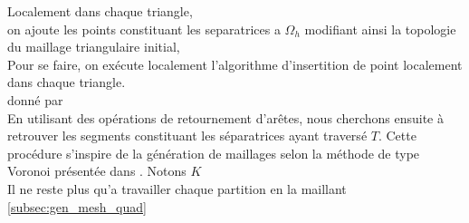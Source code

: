 Localement dans chaque triangle,\\
on ajoute les points constituant les separatrices a $\Omega_h$ modifiant ainsi la topologie du maillage triangulaire initial,\\
Pour se faire, on exécute localement l'algorithme d'insertition de point localement dans chaque triangle.\\
donné par\\
En utilisant des opérations de retournement d'arêtes, nous cherchons ensuite à retrouver les segments constituant les séparatrices ayant traversé $T$. Cette procédure s'inspire de la génération de maillages selon la méthode de type Voronoi présentée dans \cite{georgegeneration}. Notons $K$\\
Il ne reste plus qu'a travailler chaque partition en la maillant \ref{subsec:gen_mesh_quad}
